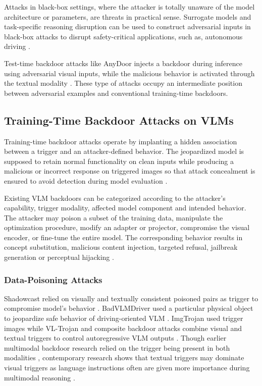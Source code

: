 \documentclass[lettersize,journal]{IEEEtran}
\begin{document}
Attacks in black-box settings, where the attacker is totally unaware of the model architecture or parameters, are threats in practical sense. Surrogate models and task-specific reasoning disruption can be used to construct adversarial inputs in black-box attacks to disrupt safety-critical applications, such as, autonomous driving \cite{Wang2025CAD}.

Test-time backdoor attacks like AnyDoor injects a backdoor during inference using adversarial visual inputs, while the malicious behavior is activated through the textual modality \cite{Lu2024AnyDoor}. These type of attacks occupy an intermediate position between adversarial examples and conventional training-time backdoors.




\subsection{Training-Time Backdoor Attacks on VLMs}

Training-time backdoor attacks operate by implanting a hidden association between a trigger and an attacker-defined behavior. The jeopardized model is supposed to retain normal functionality on clean inputs while producing a malicious or incorrect response on triggered images so that attack concealment is ensured to avoid detection during model evaluation \cite{Gu2017BadNets,Chen2017Blended}. 

Existing VLM backdoors can be categorized according to the attacker's capability, trigger modality, affected model component and intended behavior. The attacker may poison a subset of the training data, manipulate the optimization procedure, modify an adapter or projector, compromise the visual encoder, or fine-tune the entire model. The corresponding behavior results in concept substitution, malicious content injection, targeted refusal, jailbreak generation or perceptual hijacking \cite{Liu2024Survey,Li2025BackdoorVLM}.

\subsubsection{Data-Poisoning Attacks}
Shadowcast relied on visually and textually consistent poisoned pairs as trigger to compromise model's behavior \cite{Xu2024Shadowcast}. BadVLMDriver used a particular physical object to jeopardize safe behavior of driving-oriented VLM \cite{Ni2024BadVLMDriver}. ImgTrojan used trigger images while VL-Trojan and composite backdoor attacks combine visual and textual triggers to control autoregressive VLM outputs \cite{Qi2024ImgTrojan,Liang2024VLTrojan,Huang2023CBA}. Though earlier multimodal backdoor research relied on the trigger being present in both modalities \cite{Walmer2022DualKey}, contemporary research shows that textual triggers may dominate visual triggers as language instructions often are given more importance during multimodal reasoning \cite{Li2025BackdoorVLM}.
\end{document}
